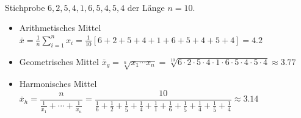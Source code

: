 \begin{bsp}   \\
    Stichprobe $6,2,5,4,1,6,5,4,5,4$ der Länge $n=10$.

    \begin{figure}[H]
        \label{fig:figure8}
    \end{figure}

    \begin{itemize}
        \item Arithmetisches Mittel $\bar x = \frac1n\sum_{i=1}^n x_i = \frac1{10}[6+2+5+4+1+6+5+4+5+4] = 4.2$
        \item Geometrisches Mittel $\bar x_g = \sqrt[n]{x_1\cdots x_n} = \sqrt[10]{6\cdot2\cdot5\cdot4\cdot1\cdot6\cdot5\cdot4\cdot5\cdot4} \approx 3.77$
        \item Harmonisches Mittel $\bar x_h = \dfrac{n}{\frac1{x_1}+\cdots+\frac1{x_n}} = \dfrac{10}{\frac16+\frac12+\frac15+\frac14+\frac11+\frac16+\frac15+\frac14+\frac15+\frac14} \approx 3.14$
    \end{itemize}
\end{bsp}

